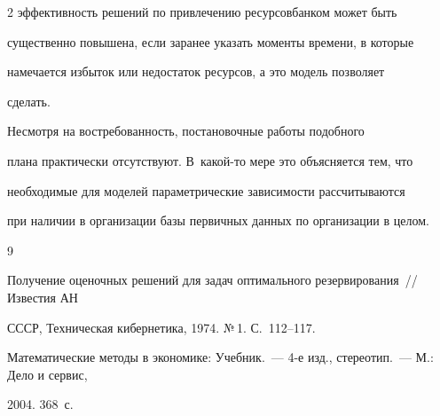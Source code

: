 \begin{multicols}{2}
эффективность решений по привлечению ресурсов\linebreak банком может быть 


существенно повышена, если заранее указать моменты времени, в которые 


намечается избыток или недостаток ресурсов, а это модель позволяет 


сделать. 


     


     Несмотря на востребованность, постановочные работы подобного 


плана практически отсутствуют. В~какой-то мере это объясняется тем, что 


необходимые для моделей параметрические зависимости рассчитываются 


при наличии в организации базы первичных данных по организации в целом.





\vspace*{-14pt}





{\small\frenchspacing


{%




\begin{thebibliography}{9}





\vspace*{-2pt}









Получение оценочных решений для задач оптимального резервирования~// Известия АН 


СССР, Техническая кибернетика, 1974. №\,1. С.~112--117.








 \label{end\stat}









Математические методы в экономике: Учебник.~--- 4-е изд., стереотип.~--- М.: Дело и сервис, 


2004. 368~с.


 \end{thebibliography}


}


}








\end{multicols}  


